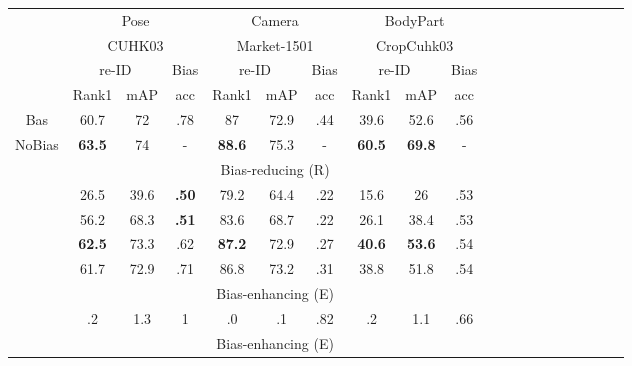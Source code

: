 \documentclass[10pt,twocolumn,letterpaper]{article}
\begin{document}
\begin{table}[h]
\scriptsize
\begin{tabular}
{@{\hskip4pt}c@{\hskip4pt}c@{\hskip5pt}c@{\hskip5pt}c@{\hskip5pt}c@{\hskip5pt}c@{\hskip5pt}c@{\hskip5pt}c@{\hskip5pt}c@{\hskip5pt}c@{\hskip5pt}c@{\hskip5pt}c@{\hskip5pt}c@{\hskip5pt}c@{\hskip5pt}c@{\hskip5pt}c@{\hskip5pt}c@{\hskip5pt}c@{\hskip5pt}c@{\hskip5pt}c} 
\multicolumn{1}{c}{\textbf{}} & \multicolumn{3}{c}{{Pose}} & \multicolumn{3}{c}{{Camera}} & \multicolumn{3}{c}{{BodyPart}} \\ 
\multicolumn{1}{c}{\textbf{}} & \multicolumn{3}{c}{{CUHK03}} & \multicolumn{3}{c}{{Market-1501}} & \multicolumn{3}{c}{{CropCuhk03}} \\\hline
 & \multicolumn{2}{c}{re-ID} & \multicolumn{1}{c|}{Bias} & \multicolumn{2}{c}{re-ID} & \multicolumn{1}{c|}{Bias} & \multicolumn{2}{c}{re-ID} & Bias \\
 & {Rank1} & mAP & \multicolumn{1}{c|}{acc} & Rank1 & mAP & \multicolumn{1}{c|}{{acc}} & Rank1 & mAP & {acc} \\
{Bas} & {60.7} & {72} & \multicolumn{1}{c|}{{.78}} & {87} & {72.9} & \multicolumn{1}{c|}{{.44}} & {39.6} & {52.6} & {.56} \\
{NoBias} & {\textbf{63.5}} & {74} & \multicolumn{1}{c|}{-} & {\textbf{88.6}} & {75.3} & \multicolumn{1}{c|}{-} & {\textbf{60.5}} & {\textbf{69.8}} & \multicolumn{1}{c}{-} \\ \hline
\multicolumn{1}{c}{} & \multicolumn{9}{c}{{Bias-reducing (R) }} \\ \hline
 & {26.5} & {39.6} & \multicolumn{1}{c|}{\textbf{.50}} & {79.2} & {64.4} & \multicolumn{1}{c|}{{.22}} & {15.6} & {26} & {.53} \\
 & {56.2} & {68.3} & \multicolumn{1}{c|}{\textbf{{.51}}} & {83.6} & {68.7} & \multicolumn{1}{c|}{{.22}} & {26.1} & {38.4} & {.53} \\
 & \textbf{{62.5}} & {73.3} & \multicolumn{1}{c|}{{.62}} & \textbf{{87.2}} & {72.9} & \multicolumn{1}{c|}{{.27}} & \textbf{{40.6}} & \textbf{53.6} & {.54} \\
 & {61.7} & {72.9} & \multicolumn{1}{c|}{{.71}} & {86.8} & {73.2} & \multicolumn{1}{c|}{.31} & {38.8} & {51.8} & {.54} \\
\hline
\multicolumn{1}{c}{} &\multicolumn{9}{c}{{Bias-enhancing (E)  }}
\\ \hline
 & {.2} & {1.3} & \multicolumn{1}{c|}{{1}} & {.0} & {.1} & \multicolumn{1}{c|}{{.82}} & {.2} & {1.1} & {.66} \\
\hline
\multicolumn{1}{c}{}
&\multicolumn{9}{c}{{Bias-enhancing (E)  }} \\ \hline

\end{tabular}
\end{table}
\end{document}
